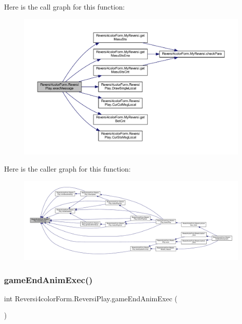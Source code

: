 Here is the call graph for this function\+:\nopagebreak
\begin{figure}[H]
\begin{center}
\leavevmode
\includegraphics[width=350pt]{class_reversi4color_form_1_1_reversi_play_a3e9c0923815d7270ae73c88ff57244d4_cgraph}
\end{center}
\end{figure}
Here is the caller graph for this function\+:\nopagebreak
\begin{figure}[H]
\begin{center}
\leavevmode
\includegraphics[width=350pt]{class_reversi4color_form_1_1_reversi_play_a3e9c0923815d7270ae73c88ff57244d4_icgraph}
\end{center}
\end{figure}
\mbox{\label{class_reversi4color_form_1_1_reversi_play_a1f415a175312ca4d39d36685d3404311}} 
\subsubsection{\texorpdfstring{game\+End\+Anim\+Exec()}{gameEndAnimExec()}}
{\footnotesize\ttfamily int Reversi4color\+Form.\+Reversi\+Play.\+game\+End\+Anim\+Exec (\begin{DoxyParamCaption}{ }\end{DoxyParamCaption})}



